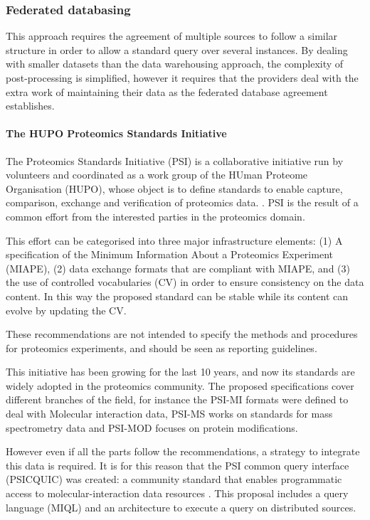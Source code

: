 \subsubsection{Federated databasing} 
This approach requires the agreement of multiple sources to follow a similar structure in order to allow a standard query over several instances. By dealing with smaller datasets than the data warehousing approach, the complexity of post-processing is simplified, however it requires that the providers deal with the extra work of maintaining their data as the federated database agreement establishes.

\paragraph{The HUPO Proteomics Standards Initiative}
The Proteomics Standards Initiative (PSI) is a collaborative initiative run by volunteers and coordinated as a work group of the HUman Proteome Organisation (HUPO), whose object is to define standards  to enable capture, comparison, exchange and verification of proteomics data. \cite{HER2006}. PSI is the result of a common effort from the interested parties in the proteomics domain.

This effort can be categorised into three major infrastructure elements: (1) A specification of the Minimum Information About a Proteomics Experiment (MIAPE), (2) data exchange formats that are compliant with MIAPE, and (3) the use of controlled vocabularies (CV) in order to ensure consistency on the data content. In this way the proposed standard can be stable while its content can evolve by updating the CV.

These recommendations are not intended to specify the methods and procedures for proteomics experiments, and should be seen as reporting guidelines.

This initiative has been growing for the last 10 years, and now its standards are widely adopted in the proteomics community. The proposed specifications cover different branches of the field, for instance the PSI-MI formats were defined to deal with Molecular interaction data, PSI-MS works on standards for mass spectrometry data and PSI-MOD focuses on protein modifications.

However even if all the parts follow the recommendations, a strategy to integrate this data is required. It is for this reason that the PSI common query interface (PSICQUIC) was created: a community standard that enables programmatic access to molecular-interaction data resources \cite{ARA2011}. This proposal includes a query language (MIQL) and an architecture to execute a query on distributed sources.

